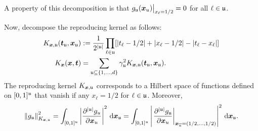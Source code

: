 \documentclass[letterpaper]{amsart}
\newcommand{\KX}{{K_{\vx}}}
\newcommand{\KXu}{K_{\vx,\fu}}
\begin{document}
A property of this decomposition is that  $g_{\mathfrak{u}}(\boldsymbol{x}_u) \bigr \vert_{x_\ell = 1/2} = 0$ for all $\ell \in \mathfrak{u}$.

Now, decompose the reproducing kernel as follows:
\begin{align*}
	K_{\vx,\fu} (\vt_\fu,\vx_\fu) &:= \frac{1}{2^{\abs{\fu}}}\prod_{\ell \in \fu} [\abs{t_\ell -1/2} + \abs{x_\ell-1/2} - \abs{t_\ell  - x_\ell}] \\
	\KX(\vx,\vt) & = \sum_{\fu \subseteq \{1, \ldots, d\}} \gamma_\fu^2   K_{\vx,\fu} (\vt_\fu,\vx_\fu).
\end{align*}
The reproducing kernel $K_{\boldsymbol{x},\mathfrak{u}}$ corresponds to a Hilbert space of functions defined on $[0,1]^{\mathfrak{u}}$ that vanish if any $x_\ell = 1/2$ for $\ell \in \mathfrak{u}$.  Moreover,
\begin{equation*}
	\norm[\KXu]{g_\fu}^2 = \int_{[0,1]^{\fu}} \abs{\frac{\partial^{\abs{\fu}} g_{u}}{\partial \vx_u}}^2 \, \dif \vx_\fu =  \int_{[0,1]^{\fu}} \abs{\left . \frac{\partial^{\abs{\fu}} g_\fu}{\partial \vx_u} \right \rvert_{\vx_{\overline{\fu}} = (1/2, \ldots, 1/2)}}^2 \, \dif \vx_\fu.
\end{equation*}
\end{document}
